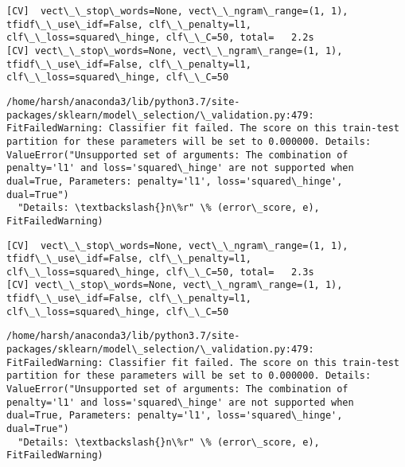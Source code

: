 \documentclass[11pt]{article}
\begin{document}
    \begin{Verbatim}[commandchars=\\\{\}]
[CV]  vect\_\_stop\_words=None, vect\_\_ngram\_range=(1, 1), tfidf\_\_use\_idf=False, clf\_\_penalty=l1, clf\_\_loss=squared\_hinge, clf\_\_C=50, total=   2.2s
[CV] vect\_\_stop\_words=None, vect\_\_ngram\_range=(1, 1), tfidf\_\_use\_idf=False, clf\_\_penalty=l1, clf\_\_loss=squared\_hinge, clf\_\_C=50 

    \end{Verbatim}

    \begin{Verbatim}[commandchars=\\\{\}]
/home/harsh/anaconda3/lib/python3.7/site-packages/sklearn/model\_selection/\_validation.py:479: FitFailedWarning: Classifier fit failed. The score on this train-test partition for these parameters will be set to 0.000000. Details: 
ValueError("Unsupported set of arguments: The combination of penalty='l1' and loss='squared\_hinge' are not supported when dual=True, Parameters: penalty='l1', loss='squared\_hinge', dual=True")
  "Details: \textbackslash{}n\%r" \% (error\_score, e), FitFailedWarning)

    \end{Verbatim}

    \begin{Verbatim}[commandchars=\\\{\}]
[CV]  vect\_\_stop\_words=None, vect\_\_ngram\_range=(1, 1), tfidf\_\_use\_idf=False, clf\_\_penalty=l1, clf\_\_loss=squared\_hinge, clf\_\_C=50, total=   2.3s
[CV] vect\_\_stop\_words=None, vect\_\_ngram\_range=(1, 1), tfidf\_\_use\_idf=False, clf\_\_penalty=l1, clf\_\_loss=squared\_hinge, clf\_\_C=50 

    \end{Verbatim}

    \begin{Verbatim}[commandchars=\\\{\}]
/home/harsh/anaconda3/lib/python3.7/site-packages/sklearn/model\_selection/\_validation.py:479: FitFailedWarning: Classifier fit failed. The score on this train-test partition for these parameters will be set to 0.000000. Details: 
ValueError("Unsupported set of arguments: The combination of penalty='l1' and loss='squared\_hinge' are not supported when dual=True, Parameters: penalty='l1', loss='squared\_hinge', dual=True")
  "Details: \textbackslash{}n\%r" \% (error\_score, e), FitFailedWarning)

    \end{Verbatim}
\end{document}
